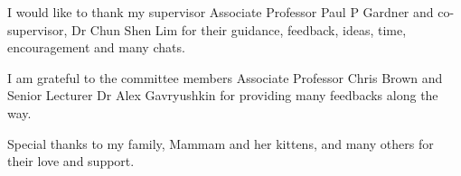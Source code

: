 \begin{acknowledgements}
I would like to thank my supervisor Associate Professor Paul P Gardner and  co-supervisor, Dr Chun Shen Lim for their guidance, feedback, ideas, time, encouragement and many chats. 

I am grateful to the committee members Associate Professor Chris Brown and Senior Lecturer Dr Alex Gavryushkin for providing many feedbacks along the way. 


Special thanks to my family, Mammam and her kittens, and many others for their love and support.

\end{acknowledgements}